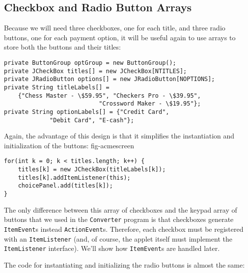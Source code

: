 \subsection{Checkbox and Radio Button Arrays}
\noindent Because we will need three checkboxes, one for each title, and three
radio buttons, one for each payment option, it will be useful again to
use arrays to store both the buttons and their titles:

\begin{jjjlisting}[26.5pc]
\begin{lstlisting}
private ButtonGroup optGroup = new ButtonGroup();
private JCheckBox titles[] = new JCheckBox[NTITLES];
private JRadioButton options[] = new JRadioButton[NOPTIONS];
private String titleLabels[] =
    {"Chess Master - \$59.95", "Checkers Pro - \$39.95",
                           "Crossword Maker - \$19.95"};
private String optionLabels[] = {"Credit Card", 
             "Debit Card", "E-cash"};
\end{lstlisting}
\end{jjjlisting}

\noindent Again, the advantage of this design is that it simplifies the
instantiation and initialization of the buttons:
 {fig-acmescreen}

\begin{jjjlisting}
\begin{lstlisting}
for(int k = 0; k < titles.length; k++) {
    titles[k] = new JCheckBox(titleLabels[k]);
    titles[k].addItemListener(this);
    choicePanel.add(titles[k]);
}
\end{lstlisting}
\end{jjjlisting}

\noindent The only difference between this array of checkboxes and the keypad
array of buttons that we used in the {\tt Converter} program is that
checkboxes generate {\tt ItemEvent}s instead
{\tt ActionEvent}s. Therefore, each checkbox must be registered with an
{\tt ItemListener} (and, of course, the applet itself must implement the
{\tt ItemListener} interface).  We'll show how {\tt ItemEvent}s are
handled later.

The code for instantiating and initializing the radio buttons is
almost the same:

